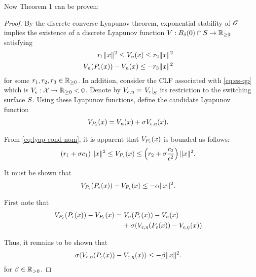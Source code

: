 \documentclass[twocolumn]{article}
\begin{document}
Now Theorem 1 can be proven:
\begin{proof}
  By the discrete converse Lyapunov theorem, exponential stability of $\Orbit$ implies the existence of a discrete Lyapunov function $\V : B_{\delta}(0) \cap \S \to \Rnn$ satisfying
  \begin{align}
    \nonumber
    r_{1} \| x \|^{2} \leq \Vn(x) \leq r_{2} \| x \|^2\\
    \Vn(\Pe(x)) - \Vn(x) \leq -r_{3} \| x \|^{2}
    \label{eq:lyap-cond-nom}
  \end{align}
  for some $r_{1}, r_{2}, r_{3} \in \Rnn$.
  In addition, consider the CLF associated with \eqref{eq:es-qp} which is $\Ve : \X \to \Rnn < 0$.
  Denote by $\Vee = \VeS$ its restriction to the switching surface $\S$.
  Using these Lyapunov functions, define the candidate Lyapunov function
  \begin{align}
    \VP(x) = \Vn(x) + \sigma \Vee(x).
  \end{align}

  From \eqref{eq:lyap-cond-nom}, it is apparent that $\VP(x)$ is bounded as follows:
  \begin{align}
    \left( r_{1} + \sigma c_{1} \right) \| x \|^{2} \leq \VP(x) \leq \left( r_{2} + \sigma \frac{c_{2}}{\epsilon^{2}}  \right) \| x \|^{2}.
  \end{align}

  It must be shown that
  \begin{align}
    \VP(\Pe(x)) - \VP(x) \leq -\alpha \| x \|^{2}.
  \end{align}

  First note that
  \begin{align}
    \VP(\Pe(x)) - \VP(x) = \Vn(\Pe(x)) - \Vn(x) \hspace{1.2cm}\\
    \nonumber
    \mbox{} + \sigma(\Vee(\Pe(x)) - \Vee(x))
  \end{align}

  Thus, it remains to be shown that
  \begin{align}
    \sigma(\Vee(\Pe(x)) - \Vee(x)) \leq -\beta \| x \|^{2}.
  \end{align}
  for $\beta \in \Rpd$.

\end{proof}
\end{document}
